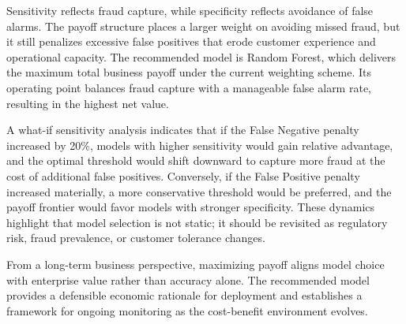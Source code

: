 Sensitivity reflects fraud capture, while specificity reflects avoidance of false alarms. The payoff structure places a larger weight on avoiding missed fraud, but it still penalizes excessive false positives that erode customer experience and operational capacity. The recommended model is Random Forest, which delivers the maximum total business payoff under the current weighting scheme. Its operating point balances fraud capture with a manageable false alarm rate, resulting in the highest net value.

A what-if sensitivity analysis indicates that if the False Negative penalty increased by 20\%, models with higher sensitivity would gain relative advantage, and the optimal threshold would shift downward to capture more fraud at the cost of additional false positives. Conversely, if the False Positive penalty increased materially, a more conservative threshold would be preferred, and the payoff frontier would favor models with stronger specificity. These dynamics highlight that model selection is not static; it should be revisited as regulatory risk, fraud prevalence, or customer tolerance changes.

From a long-term business perspective, maximizing payoff aligns model choice with enterprise value rather than accuracy alone. The recommended model provides a defensible economic rationale for deployment and establishes a framework for ongoing monitoring as the cost-benefit environment evolves.
